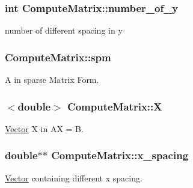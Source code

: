 \subsubsection[{number\+\_\+of\+\_\+y}]{\setlength{\rightskip}{0pt plus 5cm}int Compute\+Matrix\+::number\+\_\+of\+\_\+y\hspace{0.3cm}{\ttfamily [private]}}\label{class_compute_matrix_a0efb5ccd0d7d26dd879b0095f982b639}


number of different spacing in y 

\hypertarget{class_compute_matrix_adfd277a6083ab558b0d5dc2fc5ff5230}{}
\subsubsection[{spm}]{ Compute\+Matrix\+::spm\hspace{0.3cm}{\ttfamily [private]}}\label{class_compute_matrix_adfd277a6083ab558b0d5dc2fc5ff5230}


A in sparse Matrix Form. 

\hypertarget{class_compute_matrix_a7dab716b72de86553d960aead1497bdf}{}
\subsubsection[{X}]{$<$double$>$ Compute\+Matrix\+::\+X\hspace{0.3cm}{\ttfamily [private]}}\label{class_compute_matrix_a7dab716b72de86553d960aead1497bdf}


\hyperlink{class_vector}{Vector} X in A\+X = B. 

\hypertarget{class_compute_matrix_a85b0f0b3ccd0fad1218d7ca78c34c7d9}{}
\subsubsection[{x\+\_\+spacing}]{\setlength{\rightskip}{0pt plus 5cm}double$\ast$$\ast$ Compute\+Matrix\+::x\+\_\+spacing\hspace{0.3cm}{\ttfamily [private]}}\label{class_compute_matrix_a85b0f0b3ccd0fad1218d7ca78c34c7d9}


\hyperlink{class_vector}{Vector} containing different x spacing. 

